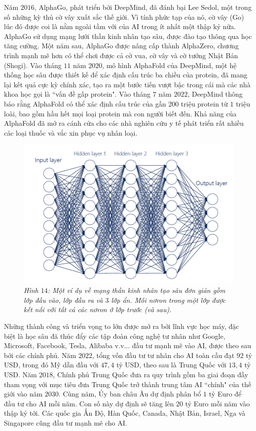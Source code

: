 \begin{multicols}{2}
	\vskip 0.1cm
	Năm $2016$, AlphaGo, phát triển bởi DeepMind, đã đánh bại Lee Sedol, một trong số những kỳ thủ cờ vây xuất sắc thế giới. Vì tính phức tạp của nó, cờ vây (Go) lúc đó được coi là nằm ngoài tầm với của AI trong ít nhất một thập kỷ nữa. AlphaGo sử dụng mạng lưới thần kinh nhân tạo sâu, được đào tạo thông qua học tăng cường. Một năm sau, AlphaGo được nâng cấp thành AlphaZero, chương trình mạnh mẽ hơn có thể chơi được cả cờ vua, cờ vây và cờ tướng Nhật Bản (Shogi).
	\vskip 0.1cm
	Vào tháng $11$ năm $2020$, mô hình AlphaFold của DeepMind, một hệ thống học sâu được thiết kế để xác định cấu trúc ba chiều của protein, đã mang lại kết quả cực kỳ chính xác, tạo ra một bước tiến vượt bậc trong cái mà các nhà khoa học gọi là ``vấn đề gấp protein". Vào tháng $7$ năm $2022$, DeepMind thông báo rằng AlphaFold có thể xác định cấu trúc của gần 200 triệu protein từ $1$ triệu loài, bao gồm hầu hết mọi loại protein mà con người biết đến. Khả năng của AlphaFold đã mở ra cánh cửa cho các nhà nghiên cứu y tế phát triển rất nhiều các loại thuốc và vắc xin phục vụ nhân loại.
	\begin{figure}[H]
		\vspace*{-5pt}
		\centering
		\captionsetup{labelformat= empty, justification=centering}
		\includegraphics[width= 1\linewidth]{Deep-Neural-Network.png}
		\caption{\small\textit{\color{cackithi}Hình $14$: Một ví dụ về mạng thần kinh nhân tạo sâu đơn giản gồm lớp đầu vào, lớp đầu ra và $3$ lớp ẩn. Mỗi nơron trong một lớp được kết nối với tất cả các nơron ở lớp trước (và sau).}}
		\vspace*{-10pt}
	\end{figure}
	Những thành công và triển vọng to lớn được mở ra bởi lĩnh vực học máy, đặc biệt là học sâu đã thúc đẩy các tập đoàn công nghệ tư nhân như Google, Microsoft, Facebook, Tesla, Alibaba v.v... đầu tư mạnh mẽ vào AI, được theo sau bởi các chính phủ. Năm $2022$, tổng vốn đầu tư tư nhân cho AI toàn cầu đạt $92$ tỷ USD, trong đó Mỹ dẫn đầu với $47{,}4$ tỷ USD, theo sau là Trung Quốc với $13{,}4$ tỷ USD. Năm $2018$, Chính phủ Trung Quốc đưa ra quy trình gồm ba giai đoạn đầy tham vọng với mục tiêu đưa Trung Quốc trở thành trung tâm AI ``chính" của thế giới vào năm $2030$. Cùng năm, Ủy ban châu Âu dự định phân bổ $1$ tỷ Euro để đầu tư cho AI mỗi năm. Con số này dự định sẽ tăng lên $20$ tỷ Euro mỗi năm vào thập kỷ tới. Các quốc gia Ấn Độ, Hàn Quốc, Canada, Nhật Bản, Israel, Nga và Singapore cũng đầu tư mạnh mẽ cho AI.

\end{multicols}
